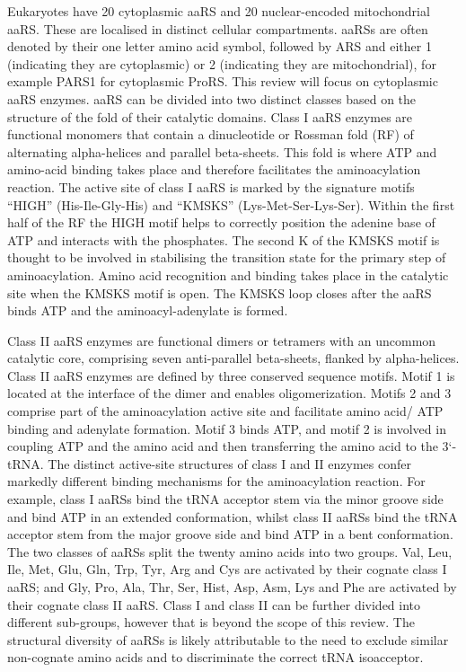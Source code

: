 Eukaryotes have 20 cytoplasmic aaRS and 20 nuclear-encoded mitochondrial aaRS.
These are localised in distinct cellular compartments.
aaRSs are often denoted by their one letter amino acid symbol, followed by ARS and either 1 (indicating they are cytoplasmic) or 2 (indicating they are mitochondrial), for example PARS1 for cytoplasmic ProRS.
This review will focus on cytoplasmic aaRS enzymes.
aaRS can be divided into two distinct classes based on the structure of the fold of their catalytic domains.
Class I aaRS enzymes are functional monomers that contain a dinucleotide or Rossman fold (RF) of alternating alpha-helices and parallel beta-sheets.
This fold is where ATP and amino-acid binding takes place and therefore facilitates the aminoacylation reaction.
The active site of class I aaRS is marked by the signature motifs ``HIGH'' (His-Ile-Gly-His) and ``KMSKS'' (Lys-Met-Ser-Lys-Ser).
Within the first half of the RF the HIGH motif helps to correctly position the adenine base of ATP and interacts with the phosphates.
The second K of the KMSKS motif is thought to be involved in stabilising the transition state for the primary step of aminoacylation\cite{newberry2002structural}.
Amino acid recognition and binding takes place in the catalytic site when the KMSKS motif is open.
The KMSKS loop closes after the aaRS binds ATP and the aminoacyl-adenylate is formed\cite{kwon2019aminoacyl}.


Class II aaRS enzymes are functional dimers or tetramers with an uncommon catalytic core, comprising seven anti-parallel beta-sheets, flanked by alpha-helices.
Class II aaRS enzymes are defined by three conserved sequence motifs.
Motif 1 is located at the interface of the dimer and enables oligomerization.
Motifs 2 and 3 comprise part of the aminoacylation active site and facilitate amino acid/ ATP binding and adenylate formation.
Motif 3 binds ATP, and motif 2 is involved in coupling ATP and the amino acid and then transferring the amino acid to the 3`-tRNA\cite{kwon2019aminoacyl}.
The distinct active-site structures of class I and II enzymes confer markedly different binding mechanisms for the aminoacylation reaction.
For example, class I aaRSs bind the tRNA acceptor stem via the minor groove side and bind ATP in an extended conformation, whilst class II aaRSs bind the tRNA acceptor stem from the major groove side and bind ATP in a bent conformation.
The two classes of aaRSs split the twenty amino acids into two groups.
Val, Leu, Ile, Met, Glu, Gln, Trp, Tyr, Arg and Cys are activated by their cognate class I aaRS; and Gly, Pro, Ala, Thr, Ser, Hist, Asp, Asm, Lys and Phe are activated by their cognate class II aaRS.
Class I and class II can be further divided into different sub-groups, however that is beyond the scope of this review.
The structural diversity of aaRSs is likely attributable to the need to exclude similar non-cognate amino acids and to discriminate the correct tRNA isoacceptor.

